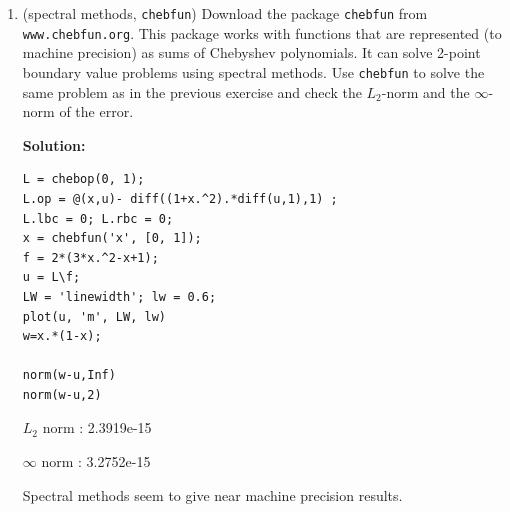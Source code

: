\documentclass[letterpaper,12pt]{article}
\begin{document}
\begin{enumerate}
\item (spectral methods, \verb+chebfun+)
Download the package \verb+chebfun+ from \verb+www.chebfun.org+. This package works
with functions that are represented (to machine precision) as sums of Chebyshev polynomials.
It can solve 2-point boundary value problems using spectral methods.  Use \verb+chebfun+
to solve the same problem as in the previous exercise and check the $L_2$-norm and the
$\infty$-norm of the error. 

{\bf Solution:}

	\begin{lstlisting}[style=MyMatlabstyle]
L = chebop(0, 1);
L.op = @(x,u)- diff((1+x.^2).*diff(u,1),1) ;
L.lbc = 0; L.rbc = 0;
x = chebfun('x', [0, 1]);
f = 2*(3*x.^2-x+1);
u = L\f;
LW = 'linewidth'; lw = 0.6;
plot(u, 'm', LW, lw)
w=x.*(1-x);

norm(w-u,Inf)
norm(w-u,2)
\end{lstlisting}

 $L_2$ norm : 2.3919e-15
 
 $\infty$ norm : 3.2752e-15
 
 Spectral methods seem to give near machine precision results.
\end{enumerate}
\end{document}
